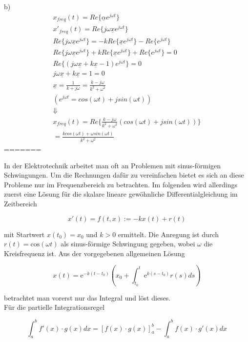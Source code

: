 b)
\begin{gather*}
x_{freq} (t)=Re\{\underline{\alpha} e^{j\omega t}\}\\
x'_{freq} (t)=Re\{j \omega \underline{x} e^{j\omega t}\}\\
Re\{j \omega \underline{x} e^{j\omega t}\}=-kRe\{\underline{x} e^{j\omega t}\}-Re\{ e^{j\omega t}\}\\
Re\{j \omega \underline{x} e^{j\omega t}\}+kRe\{\underline{x} e^{j\omega t}\}+Re\{ e^{j\omega t}\}=0\\
Re\{(j\omega \underline{x}+k\underline{x}-1)e^{j\omega t}\}=0\\
j\omega\underline{x}+k\underline{x}=1=0\\
\underline{x}=\frac{1}{k+j\omega}=\frac{k-j\omega}{k^2+\omega^2}\\
(e^{j\omega t}=cos(\omega t)+j sin(\omega t))\\
\Downarrow\\
x_{freq}(t)=Re\{\frac{k-j\omega}{k^2+\omega^2}(cos(\omega t)+jsin(\omega t))\}\\
=\frac{kcos(\omega t)+\omega sin(\omega t)}{k^2+\omega^2}
\end{gather*}
=======

In der Elektrotechnik arbeitet man oft an Problemen mit sinus-förmigen Schwingungen. Um die Rechnungen dafür zu vereinfachen bietet es sich an diese Probleme nur im Frequenzbereich zu betrachten. 
Im folgenden wird allerdings zuerst eine Lösung für die skalare lineare gewöhnliche Differentialgleichung im Zeitbereich 

\begin{equation}
	x'(t) = f(t,x) := -kx(t) +r(t)
	\label{DGL}
\end{equation}

mit Startwert $x(t_0) = x_0$ und $k > 0$ ermittelt. Die Anregung ist durch $r(t) = \mathrm{cos}(\omega t)$ als sinus-förmige Schwingung gegeben, wobei $\omega$ die Kreisfrequenz ist.
Aus der vorgegebenen allgemeinen Lösung 

\begin{equation}
	x(t)=\mathrm{e}^{-k(t-t_0)} \left(x_0+\int_{t_0}^{t} \mathrm{e}^{k(s-t_0)}r(s)ds\right)
	\label{Ansatz}
\end{equation} 

betrachtet man vorerst nur das Integral und löst dieses.\\
Für die partielle Integrationsregel 

\begin{equation*}
	\int_{a}^{b}f'(x) \cdot g(x)dx = \left[f(x) \cdot g(x)\right]^{b}_{a} - \int_{a}^{b} f(x) \cdot g'(x)dx
\end{equation*}

